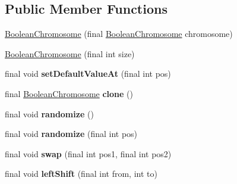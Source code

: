 \subsection*{Public Member Functions}
\begin{DoxyCompactItemize}
\item 
\hyperlink{classjenes_1_1chromosome_1_1_boolean_chromosome_add8b8de56dc676084576bcc657125414}{Boolean\-Chromosome} (final \hyperlink{classjenes_1_1chromosome_1_1_boolean_chromosome}{Boolean\-Chromosome} chromosome)
\item 
\hyperlink{classjenes_1_1chromosome_1_1_boolean_chromosome_aea950688e012d2bfe97f4f24a3fc1db6}{Boolean\-Chromosome} (final int size)
\item 
\hypertarget{classjenes_1_1chromosome_1_1_boolean_chromosome_adf2084640bd92e4d36ffea9142e39f8e}{final void {\bfseries set\-Default\-Value\-At} (final int pos)}\label{classjenes_1_1chromosome_1_1_boolean_chromosome_adf2084640bd92e4d36ffea9142e39f8e}

\item 
\hypertarget{classjenes_1_1chromosome_1_1_boolean_chromosome_a0f0ea11e413734e15dc659a3d0831801}{final \hyperlink{classjenes_1_1chromosome_1_1_boolean_chromosome}{Boolean\-Chromosome} {\bfseries clone} ()}\label{classjenes_1_1chromosome_1_1_boolean_chromosome_a0f0ea11e413734e15dc659a3d0831801}

\item 
\hypertarget{classjenes_1_1chromosome_1_1_boolean_chromosome_ab02039091f6803486d54b4f124a39b63}{final void {\bfseries randomize} ()}\label{classjenes_1_1chromosome_1_1_boolean_chromosome_ab02039091f6803486d54b4f124a39b63}

\item 
\hypertarget{classjenes_1_1chromosome_1_1_boolean_chromosome_af0249c8a5452c3a13960543ab23d4aae}{final void {\bfseries randomize} (final int pos)}\label{classjenes_1_1chromosome_1_1_boolean_chromosome_af0249c8a5452c3a13960543ab23d4aae}

\item 
\hypertarget{classjenes_1_1chromosome_1_1_boolean_chromosome_a6359dc1f495e4f7967c6a84f3206de40}{final void {\bfseries swap} (final int pos1, final int pos2)}\label{classjenes_1_1chromosome_1_1_boolean_chromosome_a6359dc1f495e4f7967c6a84f3206de40}

\item 
\hypertarget{classjenes_1_1chromosome_1_1_boolean_chromosome_a96c0fb9c3f1668cbc9ca175a183f69d4}{final void {\bfseries left\-Shift} (final int from, int to)}\label{classjenes_1_1chromosome_1_1_boolean_chromosome_a96c0fb9c3f1668cbc9ca175a183f69d4}


\end{DoxyCompactItemize}
